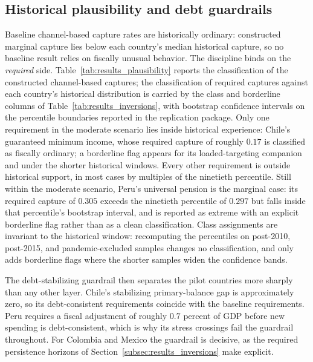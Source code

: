 \documentclass[11pt,a4paper]{article}
\begin{document}
\subsection{Historical plausibility and debt guardrails}\label{subsec:results_plausibility}

Baseline channel-based capture rates are historically ordinary: constructed marginal capture lies below each country's median
historical capture, so no baseline result relies on fiscally unusual behavior. The
discipline binds on the \emph{required} side. Table~\ref{tab:results_plausibility} reports the
classification of the constructed channel-based captures; the classification of required captures against each country's historical
distribution is carried by the class and borderline columns of Table~\ref{tab:results_inversions}, with bootstrap confidence intervals
on the percentile boundaries reported in the replication package. Only one requirement in
the moderate scenario lies inside historical experience: Chile's guaranteed minimum income,
whose required capture of roughly $0.17$ is classified as fiscally ordinary; a borderline flag appears for
its loaded-targeting companion and under the shorter historical windows. Every other requirement is
outside historical support, in most cases by multiples of the ninetieth percentile. Still within the moderate scenario, Peru's
universal pension is the marginal case: its required capture of
$0.305$ exceeds the ninetieth percentile of $0.297$ but falls inside that percentile's
bootstrap interval, and is reported as extreme with an explicit borderline flag rather than
as a clean classification. Class assignments are invariant to the historical window:
recomputing the percentiles on post-2010, post-2015, and pandemic-excluded samples changes
no classification, and only adds borderline flags where the shorter samples widen the
confidence bands.

The debt-stabilizing guardrail then separates the pilot countries more sharply than any
other layer. Chile's stabilizing primary-balance gap is approximately zero, so its
debt-consistent requirements coincide with the baseline requirements. Peru requires a fiscal
adjustment of roughly $0.7$ percent of GDP before new spending is debt-consistent, which is
why its stress crossings fail the guardrail throughout. For Colombia and Mexico the
guardrail is decisive, as the required persistence horizons of
Section~\ref{subsec:results_inversions} make explicit.


\end{document}
